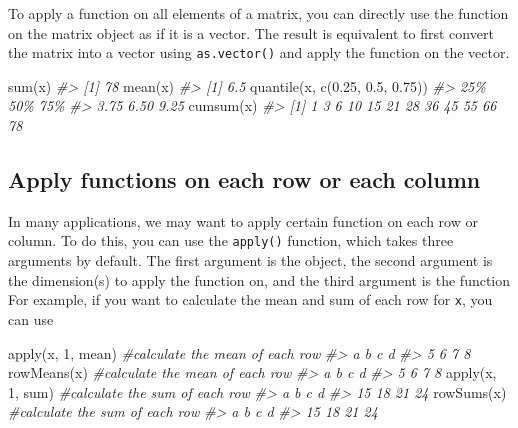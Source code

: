 \documentclass[
]{book}
\newenvironment{Shaded}{\begin{snugshade}}{\end{snugshade}}
\newcommand{\CommentTok}[1]{\textcolor[rgb]{0.56,0.35,0.01}{\textit{#1}}}
\newcommand{\DecValTok}[1]{\textcolor[rgb]{0.00,0.00,0.81}{#1}}
\newcommand{\FloatTok}[1]{\textcolor[rgb]{0.00,0.00,0.81}{#1}}
\newcommand{\FunctionTok}[1]{\textcolor[rgb]{0.00,0.00,0.00}{#1}}
\newcommand{\NormalTok}[1]{#1}
\begin{document}
To apply a function on all elements of a matrix, you can directly use the function on the matrix object as if it is a vector. The result is equivalent to first convert the matrix into a vector using \texttt{as.vector()} and apply the function on the vector.

\begin{Shaded}
\begin{Highlighting}[]
\FunctionTok{sum}\NormalTok{(x)}
\CommentTok{\#\textgreater{} [1] 78}
\FunctionTok{mean}\NormalTok{(x)}
\CommentTok{\#\textgreater{} [1] 6.5}
\FunctionTok{quantile}\NormalTok{(x, }\FunctionTok{c}\NormalTok{(}\FloatTok{0.25}\NormalTok{, }\FloatTok{0.5}\NormalTok{, }\FloatTok{0.75}\NormalTok{))}
\CommentTok{\#\textgreater{}  25\%  50\%  75\% }
\CommentTok{\#\textgreater{} 3.75 6.50 9.25}
\FunctionTok{cumsum}\NormalTok{(x)}
\CommentTok{\#\textgreater{}  [1]  1  3  6 10 15 21 28 36 45 55 66 78}
\end{Highlighting}
\end{Shaded}

\hypertarget{apply-matrix}{%
\subsection{Apply functions on each row or each column}\label{apply-matrix}}

In many applications, we may want to apply certain function on each row or column. To do this, you can use the \texttt{apply()} function, which takes three arguments by default. The first argument is the object, the second argument is the dimension(s) to apply the function on, and the third argument is the function For example, if you want to calculate the mean and sum of each row for \texttt{x}, you can use

\begin{Shaded}
\begin{Highlighting}[]
\FunctionTok{apply}\NormalTok{(x, }\DecValTok{1}\NormalTok{, mean)   }\CommentTok{\#calculate the mean of each row}
\CommentTok{\#\textgreater{} a b c d }
\CommentTok{\#\textgreater{} 5 6 7 8}
\FunctionTok{rowMeans}\NormalTok{(x)         }\CommentTok{\#calculate the mean of each row}
\CommentTok{\#\textgreater{} a b c d }
\CommentTok{\#\textgreater{} 5 6 7 8}
\FunctionTok{apply}\NormalTok{(x, }\DecValTok{1}\NormalTok{, sum)    }\CommentTok{\#calculate the sum of each row}
\CommentTok{\#\textgreater{}  a  b  c  d }
\CommentTok{\#\textgreater{} 15 18 21 24}
\FunctionTok{rowSums}\NormalTok{(x)          }\CommentTok{\#calculate the sum of each row }
\CommentTok{\#\textgreater{}  a  b  c  d }
\CommentTok{\#\textgreater{} 15 18 21 24}
\end{Highlighting}
\end{Shaded}
\end{document}
